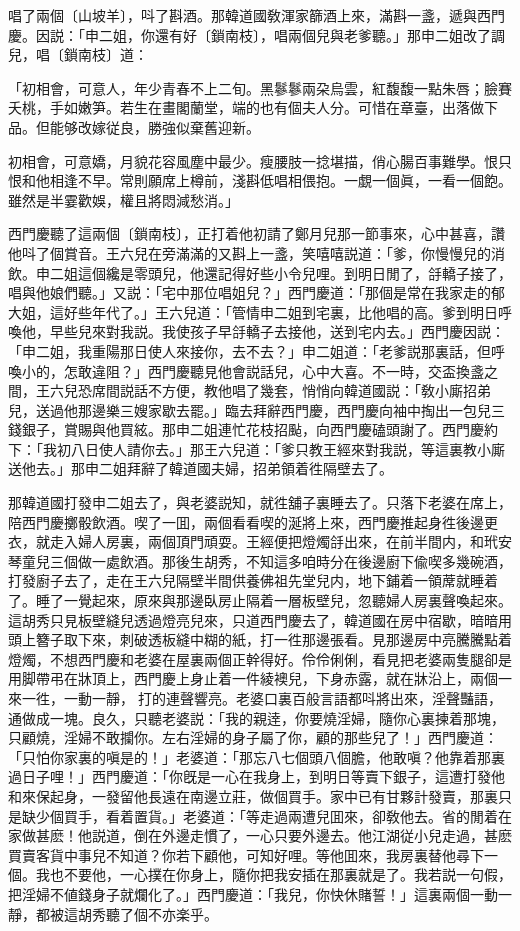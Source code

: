 唱了兩個〔山坡羊〕，呌了斟酒。那韓道國敎渾家篩酒上來，滿斟一盞，遞與西門慶。因説：「申二姐，你還有好〔鎖南枝〕，唱兩個兒與老爹聽。」那申二姐改了調兒，唱〔鎖南枝〕道：

\begin{myquote}
「初相會，可意人，年少青春不上二旬。黑鬖鬖兩朶烏雲，紅馥馥一點朱唇；臉賽夭桃，手如嫩笋。若生在畫閣蘭堂，端的也有個夫人分。可惜在章臺，出落做下品。但能够改嫁従良，勝強似棄舊迎新。

初相會，可意嬌，月貌花容風塵中最少。瘦腰肢一捻堪描，俏心腸百事難學。恨只恨和他相逢不早。常則願席上樽前，淺斟低唱相偎抱。一覷一個眞，一看一個飽。雖然是半霎歡娛，權且將悶減愁消。」
\end{myquote}

西門慶聽了這兩個〔鎖南枝〕，正打着他初請了鄭月兒那一節事來，心中甚喜，讚他呌了個賞音。王六兒在旁滿滿的又斟上一盞，笑嘻嘻説道：「爹，你慢慢兒的消飲。申二姐這個纔是零頭兒，他還記得好些小令兒哩。到明日閒了，㧱轎子接了，唱與他娘們聽。」又説：「宅中那位唱姐兒？」西門慶道：「那個是常在我家走的郁大姐，這好些年代了。」王六兒道：「管情申二姐到宅裏，比他唱的高。爹到明日呼喚他，早些兒來對我説。我使孩子早㧱轎子去接他，送到宅内去。」西門慶因説：「申二姐，我重陽那日使人來接你，去不去？」申二姐道：「老爹説那裏話，但呼喚小的，怎敢違阻？」西門慶聽見他會説話兒，心中大喜。不一時，交盃換盞之間，王六兒恐席間説話不方便，教他唱了幾套，悄悄向韓道國説：「敎小廝招弟兒，送過他那邊樂三嫂家歇去罷。」臨去拜辭西門慶，西門慶向袖中掏出一包兒三錢銀子，賞賜與他買絃。那申二姐連忙花枝招颭，向西門慶磕頭謝了。西門慶約下：「我初八日使人請你去。」那王六兒道：「爹只教王經來對我説，等這裏教小廝送他去。」那申二姐拜辭了韓道國夫婦，招弟領着徃隔壁去了。

那韓道國打發申二姐去了，與老婆説知，就徃舖子裏睡去了。只落下老婆在席上，陪西門慶擲骰飲酒。喫了一囬，兩個看看喫的涎將上來，西門慶推起身徃後邊更衣，就走入婦人房裏，兩個頂門頑耍。王經便把燈燭㧱出來，在前半間内，和玳安琴童兒三個做一處飲酒。那後生胡秀，不知這多咱時分在後邊廚下偸喫多幾碗酒，打發廚子去了，走在王六兒隔壁半間供養佛祖先堂兒内，地下鋪着一領蓆就睡着了。睡了一覺起來，原來與那邊臥房止隔着一層板壁兒，忽聽婦人房裏聲喚起來。這胡秀只見板壁縫兒透過燈亮兒來，只道西門慶去了，韓道國在房中宿歇，暗暗用頭上簪子取下來，刺破透板縫中糊的紙，打一徃那邊張看。見那邊房中亮騰騰點着燈燭，不想西門慶和老婆在屋裏兩個正幹得好。伶伶俐俐，看見把老婆兩隻腿卻是用脚帶弔在牀頂上，西門慶上身止着一件綾襖兒，下身赤露，就在牀沿上，兩個一來一徃，一動一靜，𢵞打的連聲響亮。老婆口裏百般言語都呌將出來，淫聲豔語，通做成一塊。良久，只聽老婆説：「我的親逹，你要燒淫婦，隨你心裏揀着那塊，只顧燒，淫婦不敢攔你。左右淫婦的身子屬了你，顧的那些兒了！」西門慶道：「只怕你家裏的嗔是的！」老婆道：「那忘八七個頭八個膽，他敢嗔？他靠着那裏過日子哩！」西門慶道：「你旣是一心在我身上，到明日等賣下銀子，這遭打發他和來保起身，一發留他長遠在南邊立莊，做個買手。家中已有甘夥計發賣，那裏只是缺少個買手，看着置貨。」老婆道：「等走過兩遭兒囬來，卻敎他去。省的閒着在家做甚麽！他説道，倒在外邊走慣了，一心只要外邊去。他江湖従小兒走過，甚麽買賣客貨中事兒不知道？你若下顧他，可知好哩。等他囬來，我房裏替他尋下一個。我也不要他，一心撲在你身上，隨你把我安插在那裏就是了。我若説一句假，把淫婦不値錢身子就爛化了。」西門慶道：「我兒，你快休賭誓！」這裏兩個一動一靜，都被這胡秀聽了個不亦楽乎。

